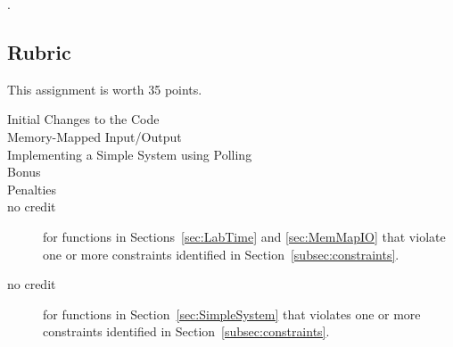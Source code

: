 


\filesubmission.

\policyforcodethatdoesnotcompile

\latepolicy

\subsection*{Rubric}

This assignment is worth 35 points.
\begin{description}
    \item[Initial Changes to the Code] %
    \initialChangesToTheCodeRubric

    \item[Memory-Mapped Input/Output] %
    \memoryMappedIORubric

    \item[Implementing a Simple System using Polling] %
    \simpleSystemRubric

    \item[Bonus]

    \item[Penalties]
    \softwareengineeringpenalties
    \item[no credit] for functions in Sections~\ref{sec:LabTime} and \ref{sec:MemMapIO} that violate one or more constraints identified in Section~\ref{subsec:constraints}.
    \item[no credit] for functions in Section~\ref{sec:SimpleSystem} that violates one or more constraints identified in Section~\ref{subsec:constraints}.
\end{description}

